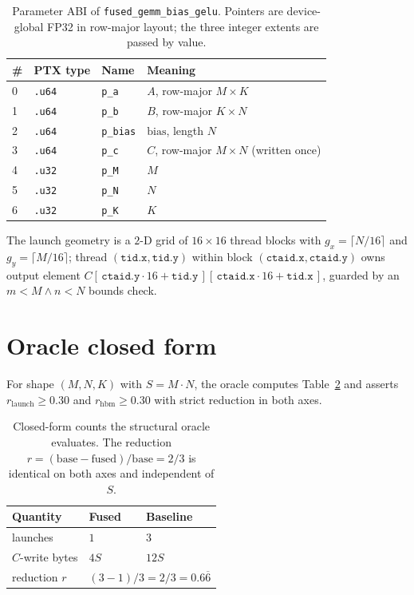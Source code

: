 \documentclass[11pt,a4paper]{article}
\begin{document}
\begin{table}[h]
\centering
\caption{Parameter ABI of \texttt{fused\_gemm\_bias\_gelu}. Pointers are
device-global FP32 in row-major layout; the three integer extents are passed by
value.}
\label{tab:abi}
\begin{tabular}{llll}
\toprule
\# & PTX type & Name & Meaning \\
\midrule
0 & \texttt{.u64} & \texttt{p\_a}    & $A$, row-major $M\times K$ \\
1 & \texttt{.u64} & \texttt{p\_b}    & $B$, row-major $K\times N$ \\
2 & \texttt{.u64} & \texttt{p\_bias} & $\mathrm{bias}$, length $N$ \\
3 & \texttt{.u64} & \texttt{p\_c}    & $C$, row-major $M\times N$ (written once) \\
4 & \texttt{.u32} & \texttt{p\_M}    & $M$ \\
5 & \texttt{.u32} & \texttt{p\_N}    & $N$ \\
6 & \texttt{.u32} & \texttt{p\_K}    & $K$ \\
\bottomrule
\end{tabular}
\end{table}

\noindent The launch geometry is a $2$-D grid of $16\times 16$ thread blocks
with $g_x = \lceil N/16\rceil$ and $g_y = \lceil M/16\rceil$; thread
$(\texttt{tid.x},\texttt{tid.y})$ within block $(\texttt{ctaid.x},
\texttt{ctaid.y})$ owns output element
$C[\,\texttt{ctaid.y}\cdot 16 + \texttt{tid.y}\,][\,\texttt{ctaid.x}\cdot 16
+ \texttt{tid.x}\,]$, guarded by an $m<M \wedge n<N$ bounds check.

\section{Oracle closed form}
\label{app:oracle}

For shape $(M,N,K)$ with $S = M\!\cdot\!N$, the oracle computes
Table~\ref{tab:closedform} and asserts $r_{\text{launch}} \geq 0.30$ and
$r_{\text{hbm}} \geq 0.30$ with strict reduction in both axes.

\begin{table}[h]
\centering
\caption{Closed-form counts the structural oracle evaluates. The reduction
$r = (\text{base}-\text{fused})/\text{base} = 2/3$ is identical on both axes
and independent of $S$.}
\label{tab:closedform}
\begin{tabular}{lll}
\toprule
Quantity & Fused & Baseline \\
\midrule
launches              & $1$        & $3$ \\
$C$-write bytes        & $4S$       & $12S$ \\
reduction $r$          & \multicolumn{2}{c}{$(3-1)/3 = 2/3 = 0.6\overline{6}$} \\
\bottomrule
\end{tabular}
\end{table}



\end{document}
